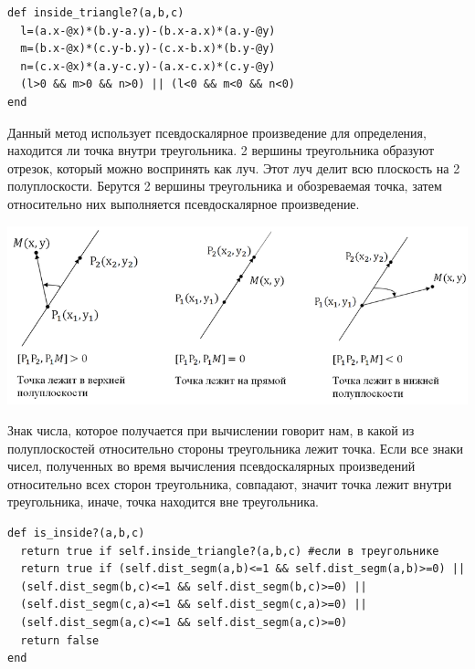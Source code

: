 \begin{small}
\begin{verbatim}
def inside_triangle?(a,b,c)
  l=(a.x-@x)*(b.y-a.y)-(b.x-a.x)*(a.y-@y)
  m=(b.x-@x)*(c.y-b.y)-(c.x-b.x)*(b.y-@y)
  n=(c.x-@x)*(a.y-c.y)-(a.x-c.x)*(c.y-@y)
  (l>0 && m>0 && n>0) || (l<0 && m<0 && n<0)
end
\end{verbatim}
\end{small} 

Данный метод использует псевдоскалярное произведение для определения, находится ли точка внутри треугольника.
2 вершины треугольника образуют отрезок, который можно воспринять как луч. Этот луч делит всю плоскость на 2 полуплоскости. Берутся 2 вершины треугольника и обозреваемая точка, затем относительно них выполняется псевдоскалярное произведение.

\begin{center}
\includegraphics[width=1.1\hsize]{images/psevd}
\end{center}

 Знак числа, которое получается при вычислении говорит нам, в какой из полуплоскостей относительно стороны треугольника лежит точка. Если все знаки чисел, полученных во время вычисления псевдоскалярных произведений относительно всех сторон треугольника, совпадают, значит точка лежит внутри треугольника, иначе, точка находится вне треугольника.

\begin{small}
\begin{verbatim}
def is_inside?(a,b,c)
  return true if self.inside_triangle?(a,b,c) #если в треугольнике
  return true if (self.dist_segm(a,b)<=1 && self.dist_segm(a,b)>=0) ||
  (self.dist_segm(b,c)<=1 && self.dist_segm(b,c)>=0) ||
  (self.dist_segm(c,a)<=1 && self.dist_segm(c,a)>=0) || 
  (self.dist_segm(a,c)<=1 && self.dist_segm(a,c)>=0)
  return false
end
\end{verbatim}
\end{small} 

